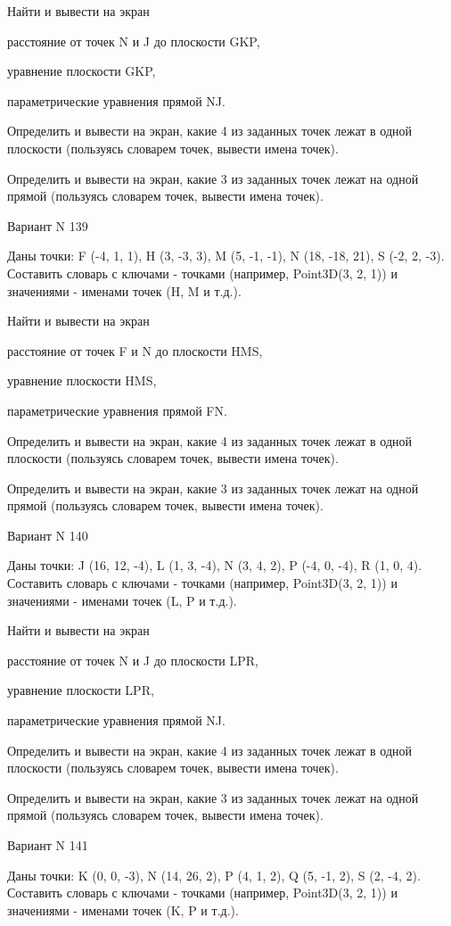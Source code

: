 \documentclass[11pt]{report}
\begin{document}
 
Найти и вывести на экран


расстояние от точек N и J до плоскости GKP,

 
уравнение плоскости GKP,

 
параметрические уравнения прямой NJ.


Определить и вывести на экран, какие 4 из заданных точек лежат в одной плоскости (пользуясь словарем точек, вывести имена точек).


Определить и вывести на экран, какие 3 из заданных точек лежат на одной прямой (пользуясь словарем точек, вывести имена точек).

Вариант N 139

Даны точки: F (-4, 1, 1), H (3, -3, 3), M (5, -1, -1), N (18, -18, 21), S (-2, 2, -3).
Составить словарь с ключами - точками (например, Point3D(3, 2, 1)) и значениями - именами точек (H, M и т.д.).

 
Найти и вывести на экран


расстояние от точек F и N до плоскости HMS,

 
уравнение плоскости HMS,

 
параметрические уравнения прямой FN.


Определить и вывести на экран, какие 4 из заданных точек лежат в одной плоскости (пользуясь словарем точек, вывести имена точек).


Определить и вывести на экран, какие 3 из заданных точек лежат на одной прямой (пользуясь словарем точек, вывести имена точек).

Вариант N 140

Даны точки: J (16, 12, -4), L (1, 3, -4), N (3, 4, 2), P (-4, 0, -4), R (1, 0, 4).
Составить словарь с ключами - точками (например, Point3D(3, 2, 1)) и значениями - именами точек (L, P и т.д.).

 
Найти и вывести на экран


расстояние от точек N и J до плоскости LPR,

 
уравнение плоскости LPR,

 
параметрические уравнения прямой NJ.


Определить и вывести на экран, какие 4 из заданных точек лежат в одной плоскости (пользуясь словарем точек, вывести имена точек).


Определить и вывести на экран, какие 3 из заданных точек лежат на одной прямой (пользуясь словарем точек, вывести имена точек).

Вариант N 141

Даны точки: K (0, 0, -3), N (14, 26, 2), P (4, 1, 2), Q (5, -1, 2), S (2, -4, 2).
Составить словарь с ключами - точками (например, Point3D(3, 2, 1)) и значениями - именами точек (K, P и т.д.).
\end{document}
